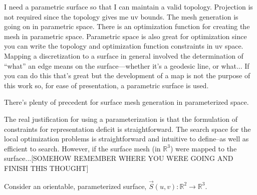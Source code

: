 I need a parametric surface so that I can maintain a valid topology.
Projection is not required since the topology gives me uv bounds. The
mesh generation is going on in parametric space. There is an
optimization function for creating the mesh in parametric space. Parametric
space is also great for optimization since you can write the topology
and optimization function constraints in uv space. Mapping a
discretization to a surface in general involved the determination of
``what'' an edge means on the surface---whether it's a geodesic line, or
what... If you can do this that's great but the development of a map
is not the purpose of this work so, for ease of presentation, a
parametric surface is used.

There's plenty of precedent for surface mesh generation in parameterized space. 

The real justification for using a parameterization is that the formulation of constraints for representation deficit is straightforward. The search space for the local optimization problems is straightforward and intuitive to define--as well as efficient to search. However, if the surface mesh (in ${\mathbb R}^3$) were mapped to the surface...[SOMEHOW REMEMBER WHERE YOU WERE GOING AND FINISH THIS THOUGHT]

Consider an orientable, parameterized surface, $\vec{S}\left(u,v\right)
: {\mathbb R}^2 \rightarrow {\mathbb R}^3$.
